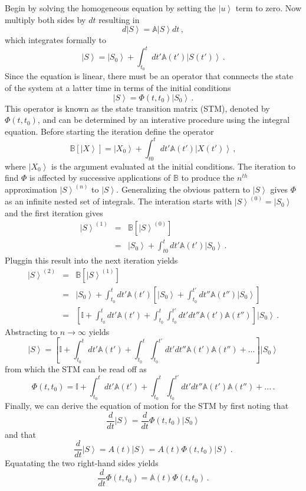 \documentclass[10pt]{article}
\begin{document}
Begin by solving the homogeneous equation by setting the 
$\left| u \right>$ term to zero.  Now multiply both sides
by $dt$ resulting in 
\[
  d \left| S \right> = {\mathbb A} \left| S \right> dt \, ,
\]
which integrates formally to 
\[
  \left| S \right> = \left| S_0 \right> + \int_{t_0}^{t} dt' {\mathbb A}(t') \left| S(t') \right>  \, .
\]
Since the equation is linear, there must be an operator that connnects
the state of the system at a latter time in terms of the initial 
conditions
\[
 \left| S \right> = \Phi(t,t_0) \left| S_0 \right> \, .
\]
This operator is known as the state transition matrix
(STM), denoted by $\Phi(t,t_0)$, and can be determined by an interative
procedure using the integral equation. Before starting the iteration
define the operator
\[
  {\mathbb B} \left[ \left| X \right> \right] = \left| X_0 \right> + \int_{t0}^t dt' {\mathbb A}(t') \left| X(t') \right>  \, ,
\]
where $\left| X_0 \right>$ is the argument evaluated at the initial
conditions.  The iteration to find $\Phi$ is affected by 
successive applications of $\mathbb B$ to produce the $n^{th}$ approximation
$\left| S \right>^{(n)}$ to $\left| S \right>$. Generalizing the 
obvious pattern to $\left| S \right>$ gives $\Phi$ as an
infinite nested set of integrals. The interation starts
with $\left| S \right>^{(0)} = \left| S_0 \right>$ and 
the first iteration gives
\begin{eqnarray*}
  \left| S \right>^{(1)} & = &  {\mathbb B}\left[ \left| S \right>^{(0)} \right] \\
                         & = & \left| S_0 \right> + \int_{t0}^t dt' {\mathbb A}(t') \left| S_0 \right> \, .
\end{eqnarray*}
Pluggin this result into the next iteration yields
\begin{eqnarray*}
  \left| S \right>^{(2)} & = &  {\mathbb B}\left[ \left| S \right>^{(1)}\right] \\
                         & = & \left| S_0 \right> + \int_{t_0}^t dt' {\mathbb A}(t') 
                                  \left[ \left| S_0 \right> + \int_{t_0}^{t'} dt'' {\mathbb A(t'')} \left| S_0 \right> \right] \\
                         & = & \left[ {\mathbb I} + \int_{t_0}^t dt' {\mathbb A}(t') + \int_{t_0}^t \int_{t_0}^{t'} dt' dt'' {\mathbb A}(t') {\mathbb A}(t'') \right] \left| S_0 \right> \, .
\end{eqnarray*}
Abstracting to $n \rightarrow \infty$ yields
\[
  \left| S \right> = \left[ {\mathbb I} + \int_{t_0}^t dt' {\mathbb A}(t') + \int_{t_0}^t \int_{t_0}^{t'} dt' dt'' {\mathbb A}(t') {\mathbb A}(t'') + ...\right] \left| S_0 \right>
\]
from which the STM can be read off as 
\[
  \Phi(t,t_0) = {\mathbb I} + \int_{t_0}^t dt' {\mathbb A}(t') + \int_{t_0}^t \int_{t_0}^{t'} dt' dt'' {\mathbb A}(t') {\mathbb A}(t'') + ... \, .
\]
Finally, we can derive the equation of motion for the STM by first noting that 
\[
  \frac{d}{dt} \left| S \right> = \frac{d}{dt} \Phi(t,t_0) \left| S_0 \right>
\]
and that 
\[
  \frac{d}{dt} \left| S \right> = A(t) \left| S \right> = A(t) \Phi(t,t_0) \left| S \right> \, .
\]
Equatating the two right-hand sides yields
\[
  \frac{d}{dt} \Phi(t,t_0) = {\mathbb A}(t) \Phi(t,t_0) \, .
\]
\end{document}

